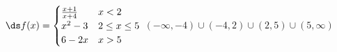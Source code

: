 {$\ds f(x) = \begin{cases} 
\frac{x+1}{x+4} & x<2 \\
x^2-3 &2\leq x\leq 5 \\
6-2x & x>5
\end{cases}$}
{$(-\infty,-4)\cup (-4,2)\cup (2,5)\cup (5,\infty)$}
